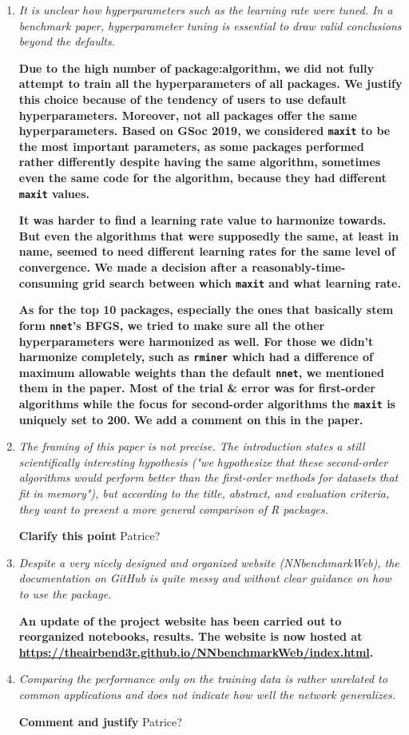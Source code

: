 \documentclass[12pt]{article}
\newcommand{\code}{\texttt}
\newcommand{\red}[1]{{\color{red}#1}}
\begin{document}
\begin{enumerate}
\item \textit{It is unclear how hyperparameters such as the learning rate were tuned. In a benchmark paper, hyperparameter tuning is essential to draw valid conclusions beyond the defaults.}

\textbf{Due to the high number of package:algorithm, we did not fully attempt to train all the hyperparameters of all packages. 
We justify this choice because of the tendency of users to use default hyperparameters. Moreover, not all packages offer the same hyperparameters. 
Based on GSoc 2019, we considered \code{maxit} to be the most important parameters, as some packages performed rather differently despite 
having the same algorithm, sometimes even the same code for the algorithm, because they had different \code{maxit} values. }

\textbf{It was harder to find a learning rate value to harmonize towards. 
But even the algorithms that were supposedly the same, at least in name, seemed to need different learning rates for the same level of convergence. 
We made a decision after a reasonably-time-consuming grid search between which \code{maxit} and what learning rate. }

\textbf{As for the top 10 packages, especially the ones that basically stem form \code{nnet}'s BFGS, we tried to make sure all the other hyperparameters 
were harmonized as well. 
For those we didn't harmonize completely, such as \code{rminer} which had a difference of maximum allowable weights than the default \code{nnet}, 
we mentioned them in the paper. 
Most of the trial \& error was for first-order algorithms while the focus for second-order algorithms the \code{maxit} is uniquely set to 200. }
\textbf{We add a comment on this in the paper.}


\item \textit{The framing of this paper is not precise. The introduction states a still scientifically interesting hypothesis ("we hypothesize that these second-order algorithms would perform better than the first-order methods for datasets that fit in memory"), but according to the title, abstract, and evaluation criteria, they want to present a more general comparison of R packages.}

\textbf{Clarify this point}
\red{Patrice?}


\item \textit{Despite a very nicely designed and organized website (NNbenchmarkWeb), the documentation on GitHub is quite messy and without clear guidance on how to use the package.}

\textbf{An update of the project website has been carried out to reorganized notebooks, results.
The website is now hosted at \url{https://theairbend3r.github.io/NNbenchmarkWeb/index.html}.}



\item \textit{Comparing the performance only on the training data is rather unrelated to common applications and does not indicate how well the network generalizes.}

\textbf{Comment and justify}
\red{Patrice?}

\end{enumerate}
\end{document}
